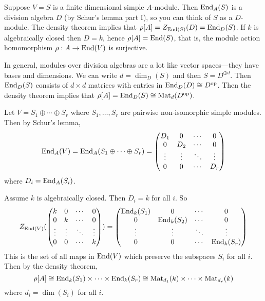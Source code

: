 \begin{exam}
	\begin{enum}
		\io
        Suppose $V=S$ is a finite dimensional simple $A$-module.
        Then $\operatorname{End}_A(S)$ is a division algebra $D$ (by Schur's lemma part I), so you can think of $S$ as a $D$-module.
        The density theorem implies that $\rho[A] = Z_{\operatorname{End}(S)}(D) = \operatorname{End}_D(S)$.        
        If $k$ is algebraically closed then $D=k$, hence $\rho[A] = \operatorname{End}(S)$, that is, the module action homomorphism $\rho:A \to \operatorname{End}(V)$ is surjective.
        
        In general, modules over division algebras are a lot like vector spaces---they have bases and dimensions.
        We can write $d = \dim_D(S)$ and then $S = D^{\oplus d}$.
		Then $\operatorname{End}_D(S)$ consists of $d \times d$ matrices with entries in $\operatorname{End}_D(D) \cong D^{\operatorname{op}}$.
        Then the density theorem implies that $\rho[A] = \operatorname{End}_D(S) \cong \operatorname{Mat}_d(D^{\operatorname{op}})$.
        
        \io
        Let $V = S_1 \oplus \cdots \oplus S_r$ where $S_1,\ldots,S_r$ are pairwise non-isomorphic simple modules.
        Then by Schur's lemma,
        \[\operatorname{End}_A(V)=\operatorname{End}_A(S_1 \oplus \cdots \oplus S_r)=
	        \begin{pmatrix}
		        D_1 & 0 & \cdots & 0 \\
		        0 & D_2 & \cdots & 0 \\
		        \vdots & \vdots & \ddots & \vdots \\
		        0 & 0 & \cdots & D_r
	        \end{pmatrix}
        \]
        where $D_i = \operatorname{End}_A(S_i)$.
        
        Assume $k$ is algebraically closed.
        Then $D_i = k$ for all $i$.
        So
        \[Z_{\operatorname{End}(V)}
	        (\begin{pmatrix}
		        k & 0 & \cdots & 0 \\
		        0 & k & \cdots & 0 \\
		        \vdots & \vdots & \ddots & \vdots \\
		        0 & 0 & \cdots & k
	        \end{pmatrix})
	        =
	        \begin{pmatrix}
		        \operatorname{End}_k(S_1) & 0 & \cdots & 0 \\
		        0 & \operatorname{End}_k(S_2) & \cdots & 0 \\
		        \vdots & \vdots & \ddots & \vdots \\
		        0 & 0 & \cdots & \operatorname{End}_k(S_r)
	        \end{pmatrix}
        \]
        This is the set of all maps in $\operatorname{End}(V)$ which preserve the subspaces $S_i$ for all $i$.
        Then by the density theorem,
        \[\rho[A] \cong \operatorname{End}_k(S_1) \times \cdots \times \operatorname{End}_k(S_r) \cong \operatorname{Mat}_{d_1}(k) \times \cdots \times \operatorname{Mat}_{d_r}(k)\]
        where $d_i = \dim(S_i)$ for all $i$.
	\end{enum}
\end{exam}
